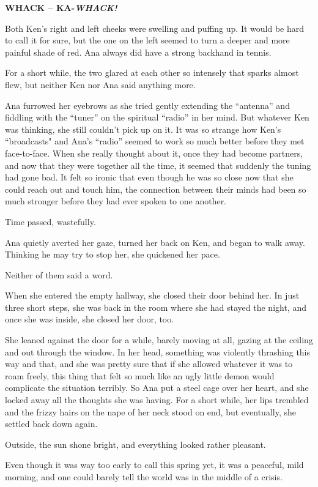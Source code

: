 \documentclass[
]{article}
\begin{document}
\textbf{WHACK -- KA-}\emph{\textbf{WHACK!}}

\textbf{}Both Ken's right and left cheeks were swelling and puffing up.
It would be hard to call it for sure, but the one on the left seemed to
turn a deeper and more painful shade of red. Ana always did have a
strong backhand in tennis.

For a short while, the two glared at each other so intensely that sparks
almost flew, but neither Ken nor Ana said anything more.

Ana furrowed her eyebrows as she tried gently extending the ``antenna''
and fiddling with the ``tuner'' on the spiritual ``radio'' in her mind.
But whatever Ken was thinking, she still couldn't pick up on it. It was
so strange how Ken's ``broadcasts" and Ana's ``radio'' seemed to work so
much better before they met face-to-face. When she really thought about
it, once they had become partners, and now that they were together all
the time, it seemed that suddenly the tuning had gone bad. It felt so
ironic that even though he was so close now that she could reach out and
touch him, the connection between their minds had been so much stronger
before they had ever spoken to one another.

Time passed, wastefully.

Ana quietly averted her gaze, turned her back on Ken, and began to walk
away. Thinking he may try to stop her, she quickened her pace.

Neither of them said a word.

When she entered the empty hallway, she closed their door behind her. In
just three short steps, she was back in the room where she had stayed
the night, and once she was inside, she closed her door, too.

She leaned against the door for a while, barely moving at all, gazing at
the ceiling and out through the window. In her head, something was
violently thrashing this way and that, and she was pretty sure that if
she allowed whatever it was to roam freely, this thing that felt so much
like an ugly little demon would complicate the situation terribly. So
Ana put a steel cage over her heart, and she locked away all the
thoughts she was having. For a short while, her lips trembled and the
frizzy hairs on the nape of her neck stood on end, but eventually, she
settled back down again.

Outside, the sun shone bright, and everything looked rather pleasant.

Even though it was way too early to call this spring yet, it was a
peaceful, mild morning, and one could barely tell the world was in the
middle of a crisis.
\end{document}

